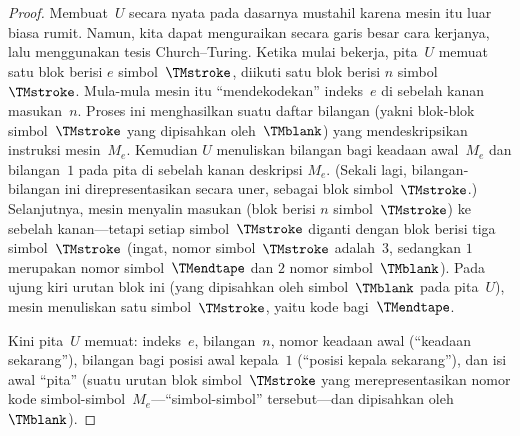 \documentclass[../../../include/open-logic-section]{subfiles}
\begin{document}
\begin{proof}
  Membuat~$U$ secara nyata pada dasarnya mustahil karena mesin itu luar biasa
  rumit. Namun, kita dapat menguraikan secara garis besar cara kerjanya, lalu
  menggunakan tesis Church--Turing. Ketika mulai bekerja, pita~$U$ memuat satu
  blok berisi $e$ simbol~$\TMstroke$, diikuti satu blok berisi $n$
  simbol~$\TMstroke$. Mula-mula mesin itu ``mendekodekan'' indeks~$e$ di
  sebelah kanan masukan~$n$. Proses ini menghasilkan suatu daftar bilangan
  (yakni blok-blok simbol~$\TMstroke$ yang dipisahkan oleh~$\TMblank$) yang
  mendeskripsikan instruksi mesin~$M_e$. Kemudian $U$ menuliskan bilangan bagi
  keadaan awal~$M_e$ dan bilangan~$1$ pada pita di sebelah kanan deskripsi
  $M_e$. (Sekali lagi, bilangan-bilangan ini direpresentasikan secara uner,
  sebagai blok simbol~$\TMstroke$.) Selanjutnya, mesin menyalin masukan (blok
  berisi $n$ simbol~$\TMstroke$) ke sebelah kanan---tetapi setiap
  simbol~$\TMstroke$ diganti dengan blok berisi tiga simbol~$\TMstroke$
  (ingat, nomor simbol~$\TMstroke$ adalah~$3$, sedangkan $1$ merupakan nomor
  simbol~$\TMendtape$ dan $2$ nomor simbol~$\TMblank$). Pada ujung kiri urutan
  blok ini (yang dipisahkan oleh simbol~$\TMblank$ pada pita~$U$), mesin
  menuliskan satu simbol~$\TMstroke$, yaitu kode bagi~$\TMendtape$.

  Kini pita~$U$ memuat: indeks~$e$, bilangan~$n$, nomor keadaan awal
  (``keadaan sekarang''), bilangan bagi posisi awal kepala~$1$ (``posisi kepala
  sekarang''), dan isi awal ``pita'' (suatu urutan blok simbol~$\TMstroke$ yang
  merepresentasikan nomor kode simbol-simbol~$M_e$---``simbol-simbol''
  tersebut---dan dipisahkan oleh~$\TMblank$).


\end{proof}
\end{document}
